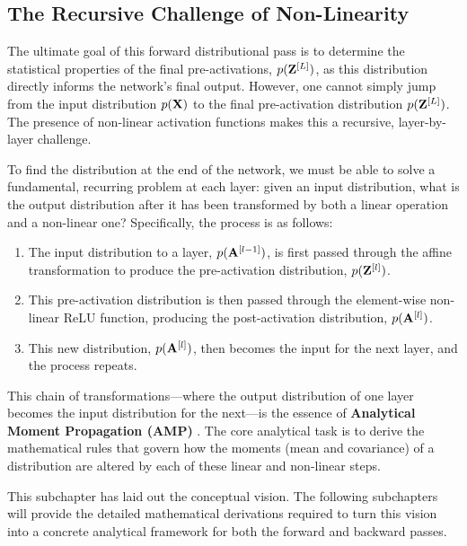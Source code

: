 \subsection{The Recursive Challenge of Non-Linearity}
The ultimate goal of this forward distributional pass is to determine the statistical properties of the final pre-activations, $p(\mathbf{Z}^{[L]})$, as this distribution directly informs the network's final output. However, one cannot simply jump from the input distribution $p(\mathbf{X})$ to the final pre-activation distribution $p(\mathbf{Z}^{[L]})$. The presence of non-linear activation functions makes this a recursive, layer-by-layer challenge.

To find the distribution at the end of the network, we must be able to solve a fundamental, recurring problem at each layer: given an input distribution, what is the output distribution after it has been transformed by both a linear operation and a non-linear one? Specifically, the process is as follows:
\begin{enumerate}
    \item The input distribution to a layer, $p(\mathbf{A}^{[l-1]})$, is first passed through the affine transformation to produce the pre-activation distribution, $p(\mathbf{Z}^{[l]})$.
    \item This pre-activation distribution is then passed through the element-wise non-linear ReLU function, producing the post-activation distribution, $p(\mathbf{A}^{[l]})$.
    \item This new distribution, $p(\mathbf{A}^{[l]})$, then becomes the input for the next layer, and the process repeats.
\end{enumerate}
This chain of transformations—where the output distribution of one layer becomes the input distribution for the next—is the essence of \textbf{Analytical Moment Propagation (AMP)} \cite{Wright2024AnalyticCovariance, Schoenholz2017DeepInfoProp}. The core analytical task is to derive the mathematical rules that govern how the moments (mean and covariance) of a distribution are altered by each of these linear and non-linear steps.

This subchapter has laid out the conceptual vision. The following subchapters will provide the detailed mathematical derivations required to turn this vision into a concrete analytical framework for both the forward and backward passes.

\ifdefined\ispartofbook
\else
  
\fi
